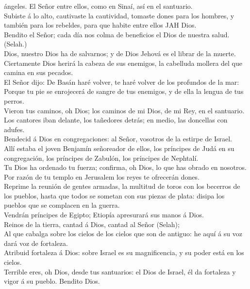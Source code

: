 ángeles. El Señor entre ellos, como en Sinaí, así en el santuario.\\
 Subiste á lo alto, cautivaste la cautividad, tomaste dones
para los hombres, y también para los rebeldes, para que habite entre
ellos JAH Dios.\\
 Bendito el Señor; cada día nos colma de beneficios el Dios
de nuestra salud. (Selah.)\\
 Dios, nuestro Dios ha de salvarnos; y de Dios Jehová es el
librar de la muerte.\\
 Ciertamente Dios herirá la cabeza de sus enemigos, la
cabelluda mollera del que camina en sus pecados.\\
 El Señor dijo: De Basán haré volver, te haré volver de los
profundos de la mar:\\
 Porque tu pie se enrojecerá de sangre de tus enemigos, y
de ella la lengua de tus perros.\\
 Vieron tus caminos, oh Dios; los caminos de mi Dios, de mi
Rey, en el santuario.\\
 Los cantores iban delante, los tañedores detrás; en medio,
las doncellas con adufes.\\
 Bendecid á Dios en congregaciones: al Señor, vosotros de
la estirpe de Israel.\\
 Allí estaba el joven Benjamín señoreador de ellos, los
príncipes de Judá en su congregación, los príncipes de Zabulón, los
príncipes de Nephtalí.\\
 Tu Dios ha ordenado tu fuerza; confirma, oh Dios, lo que
has obrado en nosotros.\\
 Por razón de tu templo en Jerusalem los reyes te ofrecerán
dones.\\
 Reprime la reunión de gentes armadas, la multitud de toros
con los becerros de los pueblos, hasta que todos se sometan con sus
piezas de plata: disipa los pueblos que se complacen en la guerra.\\
 Vendrán príncipes de Egipto; Etiopía apresurará sus manos
á Dios.\\
 Reinos de la tierra, cantad á Dios, cantad al Señor
(Selah);\\
 Al que cabalga sobre los cielos de los cielos que son de
antiguo: he aquí á su voz dará voz de fortaleza.\\
 Atribuid fortaleza á Dios: sobre Israel es su
magnificencia, y su poder está en los cielos.\\
 Terrible eres, oh Dios, desde tus santuarios: el Dios de
Israel, él da fortaleza y vigor á su pueblo. Bendito Dios.

